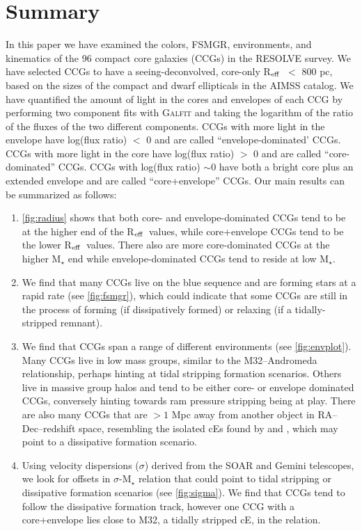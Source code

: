 \documentclass[iop,apj]{emulateapj}
\newcommand{\Reff}{R$_{\rm eff}$}
\begin{document}
\section{Summary}
\label{conclusions}

\noindent In this paper we have examined the colors, FSMGR, environments, and kinematics of the 96 compact core galaxies (CCGs) in the RESOLVE survey. We have selected CCGs to have a seeing-deconvolved, core-only \Reff\ $<$ 800 pc, based on the sizes of the compact and dwarf ellipticals in the AIMSS catalog. We have quantified the amount of light in the cores and envelopes of each CCG by performing two component fits with \textsc{Galfit} and taking the logarithm of the ratio of the fluxes of the two different components. CCGs with more light in the envelope have log(flux ratio) $<$ 0 and are called ``envelope-dominated' CCGs. CCGs with more light in the core have log(flux ratio) $>$ 0 and are called ``core-dominated'' CCGs. CCGs with log(flux ratio) $\sim 0$ have both a bright core plus an extended envelope and are called ``core+envelope'' CCGs. Our main results can be summarized as follows:

\begin{enumerate}
\item \autoref{fig:radius} shows that both core- and envelope-dominated CCGs tend to be at the higher end of the \Reff\ values, while core+envelope CCGs tend to be the lower \Reff\ values. There also are more core-dominated CCGs at the higher M$_{\star}$ end while envelope-dominated CCGs tend to reside at low M$_{\star}$.

\item We find that many CCGs live on the blue sequence and are forming stars at a rapid rate (see \autoref{fig:fsmgr}), which could indicate that some CCGs are still in the process of forming (if dissipatively formed) or relaxing (if a tidally-stripped remnant).

\item We find that CCGs span a range of different environments (see \autoref{fig:envplot}). Many CCGs live in low mass groups, similar to the M32--Andromeda relationship, perhaps hinting at tidal stripping formation scenarios. Others live in massive group halos and tend to be either core- or envelope dominated CCGs, conversely hinting towards ram pressure stripping being at play. There are also many CCGs that are $>1$ Mpc away from another object in RA--Dec--redshift space, resembling the isolated cEs found by \citet{Huxor2013} and \citet{Paudel2014}, which may point to a dissipative formation scenario.

\item Using velocity dispersions ($\sigma$) derived from the SOAR and Gemini telescopes, we look for offsets in $\sigma$-M$_{\star}$ relation that could point to tidal stripping or dissipative formation scenarios (see \autoref{fig:sigma}). We find that CCGs tend to follow the dissipative formation track, however one CCG with a core+envelope lies close to M32, a tidally stripped cE, in the relation. 
\end{enumerate}
\end{document}
